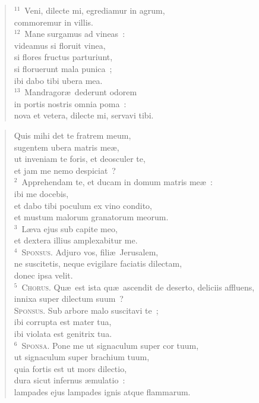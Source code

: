 \begin{flushleft}
\begin{verse}
${}^{11}$~Veni, dilecte mi, egrediamur in agrum,\\ commoremur in villis.\\
${}^{12}$~Mane surgamus ad vineas~:\\ videamus si floruit vinea,\\ si flores fructus parturiunt,\\ si floruerunt mala punica~;\\ ibi dabo tibi ubera mea.\\
${}^{13}$~Mandragor\ae\ dederunt odorem\\ in portis nostris omnia poma~:\\ nova et vetera, dilecte mi, servavi tibi.\end{verse}\end{flushleft}


\begin{flushleft}\begin{verse}\vspace{-19pt}Quis mihi det te fratrem meum,\\ sugentem ubera matris me\ae ,\\ ut inveniam te foris, et deosculer te,\\ et jam me nemo despiciat~?\\
${}^{2}$~Apprehendam te, et ducam in domum matris me\ae~:\\ ibi me docebis,\\ et dabo tibi poculum ex vino condito,\\ et mustum malorum granatorum meorum.\\
${}^{3}$~L\ae va ejus sub capite meo,\\ et dextera illius amplexabitur me.\\
${}^{4}$~\textsc{Sponsus.} Adjuro vos, fili\ae\ Jerusalem,\\ ne suscitetis, neque evigilare faciatis dilectam,\\ donec ipsa velit.\\
${}^{5}$~\textsc{Chorus.} Qu\ae\ est ista qu\ae\ ascendit de deserto, deliciis affluens,\\ innixa super dilectum suum~?\\ \textsc{Sponsus.} Sub arbore malo suscitavi te~;\\ ibi corrupta est mater tua,\\ ibi violata est genitrix tua.\\
${}^{6}$~\textsc{Sponsa.} Pone me ut signaculum super cor tuum,\\ ut signaculum super brachium tuum,\\ quia fortis est ut mors dilectio,\\ dura sicut infernus \ae mulatio~:\\ lampades ejus lampades ignis atque flammarum.\\

\end{verse}
\end{flushleft}

